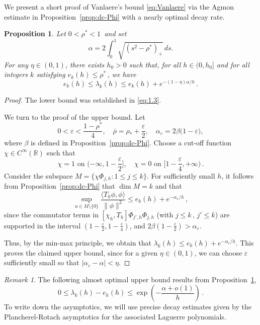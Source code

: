 \documentclass[11pt]{amsart}
\numberwithin{equation}{section}
\newtheorem{proposition}[theorem]{Proposition}
\theoremstyle{remark}
\newtheorem{remark}[theorem]{Remark}
\newcommand{\R}{\mathbb{R}}
\begin{document}
We present a short proof of Vanlaere's bound \eqref{eq:Vanlaere} via the  Agmon estimate in Proposition~\ref{prop:dc-Phi}  with a nearly optimal decay rate.

%
\begin{proposition}\label{prop:Vanlaere}
  Let $0<\rho^*<1\,$ and set
 \[\alpha=2\int_0^1\sqrt{(s^2-\rho^*)_+}\,ds.\]
For any $\eta\in(0,1)$, there exists $h_0>0$ such that, for all $h\in(0,h_0]$ and for all integers $k$ satisfying $e_k(h)\leq \rho^*\,$, we have
\[e_k(h)\leq \lambda_k(h)\leq e_k(h)+e^{-(1-\eta)\alpha/h}\,.\]
\end{proposition}
\begin{proof}
The lower bound  was established in \eqref{eq:1.3}.

We turn to the proof of the upper bound.  Let 
    \[0<\varepsilon<\frac{1-\rho^*}{4},\quad \bar\rho=\rho_*+\frac{\varepsilon}{2},\quad \alpha_\varepsilon
      =2\beta\bigl(1-\varepsilon\bigr),
    \] 
    where $\beta$ is defined in Proposition~\ref{prop:dc-Phi}. Choose a cut-off function $\chi\in C^\infty(\R)$ such that
    \[\chi=1\text{ on $(-\infty,1-\frac{\varepsilon}{2}],$}\quad \chi=0\text{ on $[1-\frac{\varepsilon}{4},+\infty)$}\,.\]
      Consider the subspace $M=\{\chi\Phi_{j,h}\colon 1\leq j\leq k\}$.  For sufficiently small $h$, it follows from Proposition~\ref{prop:dc-Phi} that
    $\dim M=k$ and that
    \[\sup_{u\in M\setminus\{0\}}\frac{\langle T_h\phi,\phi\rangle}{\|\phi\|^2}\leq e_k(h)+e^{-\alpha_\varepsilon/h}\,,\]
    since the commutator terms in $[\chi_h,T_h]\Phi_{j',h}\Phi_{j,h}$ (with $j\leq k\,,\, j'\leq k$) are supported in the interval  $(1-\frac{\varepsilon}{2},1-\frac{\varepsilon}{4})$, and $2\beta(1-\frac{\varepsilon}{2})>\alpha_\varepsilon$. 
    
    Thus, by the min-max principle, we obtain that $\lambda_k(h)\leq e_k(h)+e^{-\alpha_\varepsilon/h}.$  This proves the claimed upper bound, since for a given $\eta\in(0,1)$, we can choose $\varepsilon$ sufficiently small so that $|\alpha_\varepsilon -\alpha|<\eta$.\end{proof}

\begin{remark}\label{rem:prop2.1}
The following almost optimal upper bound results from Proposition~\ref{prop:Vanlaere},
\[0\leq \lambda_k(h)-e_k(h)\leq \exp\left(-\frac{\alpha+o(1)}{h}\right)\,.\]
To write down the asymptotics,  we will use precise decay estimates given by the Plancherel-Rotach asymptotics for the associated Laguerre polynomials.
\end{remark}
\end{document}
